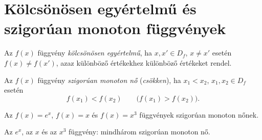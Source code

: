 \documentclass[11pt]{article}
\begin{document}
\section{Kölcsönösen egyértelmű és szigorúan monoton függvények}

\begin{defbox}
\begin{definition}
Az $f(x)$ függvény \emph{kölcsönösen egyértelmű}, ha $x, x'\in D_{f}$, $x\neq x'$ esetén $f(x)\neq f(x')$, azaz különböző értékekhez különböző értékeket rendel.
\end{definition}
\end{defbox}

\begin{defbox}
\begin{definition}
Az $f(x)$ függvény \emph{szigorúan monoton nő} (\emph{csökken}), ha $x_{1}<x_{2}$, $x_{1}, x_{2}\in D_{f}$ esetén
\[
f(x_{1})<f(x_{2})\qquad \bigl(f(x_{1})>f(x_{2})\bigr).
\]
\end{definition}
\end{defbox}

\begin{exbox}
\begin{example}
Az $f(x)=e^{x}$, $f(x)=x$ és $f(x)=x^{3}$ függvények szigorúan monoton nőnek.
\end{example}
\end{exbox}

\begin{notefig}{Az $e^{x}$, az $x$ és az $x^{3}$ függvény: mindhárom szigorúan monoton nő.}
\hspace{0.3em}
\hspace{0.3em}
\end{notefig}
\end{document}
